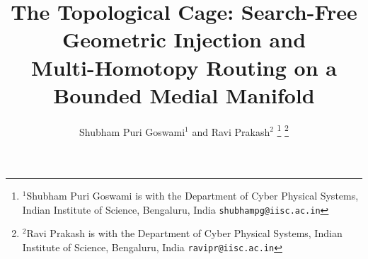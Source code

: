 \documentclass[conference]{IEEEtran}
\begin{document}
\title{\LARGE \bf
The Topological Cage: Search-Free Geometric Injection and \\
Multi-Homotopy Routing on a Bounded Medial Manifold
}

\author{Shubham Puri Goswami$^{1}$ and Ravi Prakash$^{2}$%
\thanks{$^{1}$Shubham Puri Goswami is with the Department of Cyber Physical Systems, Indian Institute of Science, Bengaluru, India {\tt\small shubhampg@iisc.ac.in}}%
\thanks{$^{2}$Ravi Prakash is with the Department of Cyber Physical Systems, Indian Institute of Science, Bengaluru, India {\tt\small ravipr@iisc.ac.in}}%
}

\maketitle
\thispagestyle{empty}
\pagestyle{empty}
\end{document}
